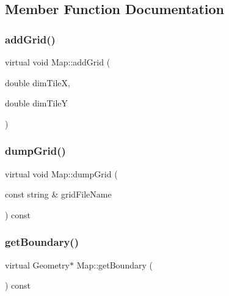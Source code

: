 \subsection{Member Function Documentation}
\mbox{\label{class_map_a24246583fbf3bbed56bfb5cd595f941f}} 
\subsubsection{\texorpdfstring{add\+Grid()}{addGrid()}}
{\footnotesize\ttfamily virtual void Map\+::add\+Grid (\begin{DoxyParamCaption}\item[{double}]{dim\+TileX,  }\item[{double}]{dim\+TileY }\end{DoxyParamCaption})\hspace{0.3cm}{\ttfamily [virtual]}}

\mbox{\label{class_map_afb74aa56fb64f4ab4857269c7924ec5a}} 
\subsubsection{\texorpdfstring{dump\+Grid()}{dumpGrid()}}
{\footnotesize\ttfamily virtual void Map\+::dump\+Grid (\begin{DoxyParamCaption}\item[{const string \&}]{grid\+File\+Name }\end{DoxyParamCaption}) const\hspace{0.3cm}{\ttfamily [virtual]}}

\mbox{\label{class_map_aa6b66dc80060a42151228f3764db539f}} 
\subsubsection{\texorpdfstring{get\+Boundary()}{getBoundary()}}
{\footnotesize\ttfamily virtual Geometry$\ast$ Map\+::get\+Boundary (\begin{DoxyParamCaption}{ }\end{DoxyParamCaption}) const\hspace{0.3cm}{\ttfamily [pure virtual]}}



